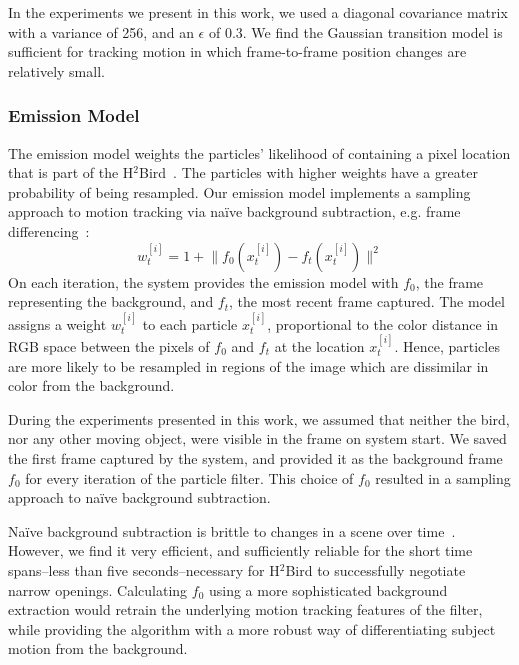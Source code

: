 \documentclass{aamas2013}
\providecommand{\norm}[1]{\lVert#1\rVert}
\begin{document}
In the experiments we present in this work, we used a diagonal covariance matrix 
with a variance of 256, and an $\epsilon$ of 0.3. We find the Gaussian 
transition model is sufficient for tracking motion in which frame-to-frame 
position changes are relatively small.

\subsubsection{Emission Model}
The emission model weights the particles' likelihood of containing a pixel
location that is part of the H$^2$Bird~\cite{Doucet2001}. The particles with
higher weights have a greater probability of being resampled. Our emission
model implements a sampling approach to motion tracking via na\"{i}ve
background subtraction, e.g. frame differencing~\cite{Ahad2011Computer}:
\begin{equation}
\label{eq:emission_model}
w^{[i]}_t = 1 + \norm{f_0(x^{[i]}_t)-f_t(x^{[i]}_t)}^2
\end{equation} 
On each iteration, the system provides the emission 
model with $f_0$, the frame representing the background, and $f_t$, the most 
recent frame captured. The model assigns a weight $w^{[i]}_t$ to each 
particle $x^{[i]}_t$, proportional to the color distance in RGB space 
between the pixels of $f_0$ and $f_t$ at the location $x^{[i]}_t$.
Hence, particles are more likely to be resampled in regions of 
the image which are dissimilar in color from the background.

During the experiments presented in this work, we assumed that neither the 
bird, nor any other moving object, were visible in the frame on system 
start. We saved the first frame captured by the system, and provided it as 
the background frame $f_0$ for every iteration of the particle filter. This 
choice of $f_0$ resulted in a sampling approach to na\"{i}ve background 
subtraction. 

Na\"{i}ve background subtraction is brittle to changes in a scene over 
time~\cite{Ahad2011Computer}. However, we find it very efficient, and sufficiently 
reliable for the short time spans--less than five seconds--necessary for 
H$^2$Bird to successfully negotiate narrow openings. Calculating $f_0$ 
using a more sophisticated background extraction would retrain the 
underlying motion tracking features of the filter, while providing the 
algorithm with a more robust way of differentiating subject motion from the 
background.
\end{document}
